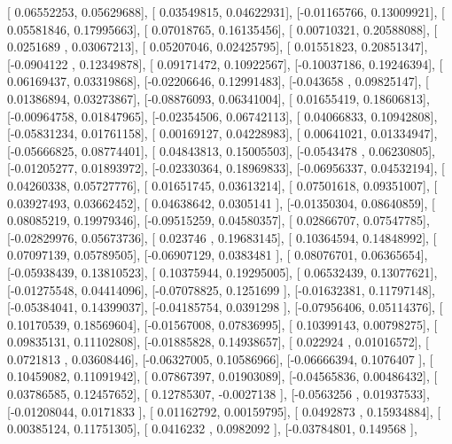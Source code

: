 \documentclass{article}
\begin{document}
       [ 0.06552253,  0.05629688],
       [ 0.03549815,  0.04622931],
       [-0.01165766,  0.13009921],
       [ 0.05581846,  0.17995663],
       [ 0.07018765,  0.16135456],
       [ 0.00710321,  0.20588088],
       [ 0.0251689 ,  0.03067213],
       [ 0.05207046,  0.02425795],
       [ 0.01551823,  0.20851347],
       [-0.0904122 ,  0.12349878],
       [ 0.09171472,  0.10922567],
       [-0.10037186,  0.19246394],
       [ 0.06169437,  0.03319868],
       [-0.02206646,  0.12991483],
       [-0.043658  ,  0.09825147],
       [ 0.01386894,  0.03273867],
       [-0.08876093,  0.06341004],
       [ 0.01655419,  0.18606813],
       [-0.00964758,  0.01847965],
       [-0.02354506,  0.06742113],
       [ 0.04066833,  0.10942808],
       [-0.05831234,  0.01761158],
       [ 0.00169127,  0.04228983],
       [ 0.00641021,  0.01334947],
       [-0.05666825,  0.08774401],
       [ 0.04843813,  0.15005503],
       [-0.0543478 ,  0.06230805],
       [-0.01205277,  0.01893972],
       [-0.02330364,  0.18969833],
       [-0.06956337,  0.04532194],
       [ 0.04260338,  0.05727776],
       [ 0.01651745,  0.03613214],
       [ 0.07501618,  0.09351007],
       [ 0.03927493,  0.03662452],
       [ 0.04638642,  0.0305141 ],
       [-0.01350304,  0.08640859],
       [ 0.08085219,  0.19979346],
       [-0.09515259,  0.04580357],
       [ 0.02866707,  0.07547785],
       [-0.02829976,  0.05673736],
       [ 0.023746  ,  0.19683145],
       [ 0.10364594,  0.14848992],
       [ 0.07097139,  0.05789505],
       [-0.06907129,  0.0383481 ],
       [ 0.08076701,  0.06365654],
       [-0.05938439,  0.13810523],
       [ 0.10375944,  0.19295005],
       [ 0.06532439,  0.13077621],
       [-0.01275548,  0.04414096],
       [-0.07078825,  0.1251699 ],
       [-0.01632381,  0.11797148],
       [-0.05384041,  0.14399037],
       [-0.04185754,  0.0391298 ],
       [-0.07956406,  0.05114376],
       [ 0.10170539,  0.18569604],
       [-0.01567008,  0.07836995],
       [ 0.10399143,  0.00798275],
       [ 0.09835131,  0.11102808],
       [-0.01885828,  0.14938657],
       [ 0.022924  ,  0.01016572],
       [ 0.0721813 ,  0.03608446],
       [-0.06327005,  0.10586966],
       [-0.06666394,  0.1076407 ],
       [ 0.10459082,  0.11091942],
       [ 0.07867397,  0.01903089],
       [-0.04565836,  0.00486432],
       [ 0.03786585,  0.12457652],
       [ 0.12785307, -0.0027138 ],
       [-0.0563256 ,  0.01937533],
       [-0.01208044,  0.0171833 ],
       [ 0.01162792,  0.00159795],
       [ 0.0492873 ,  0.15934884],
       [ 0.00385124,  0.11751305],
       [ 0.0416232 ,  0.0982092 ],
       [-0.03784801,  0.149568  ],
\end{document}
